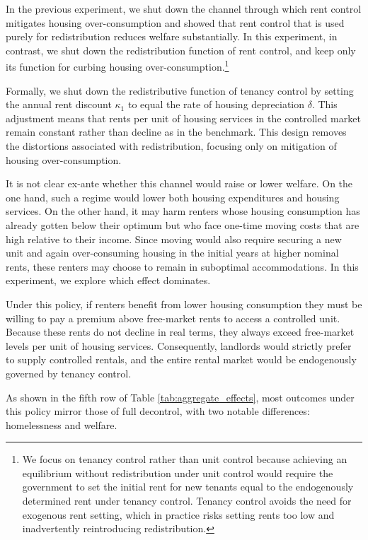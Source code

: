 \documentclass[parskip=full]{article}
\begin{document}
In the previous experiment, we shut down the channel through which rent control mitigates housing over-consumption and showed that rent control that is used purely for redistribution reduces welfare substantially. In this experiment, in contrast, we shut down the redistribution function of rent control, and keep only its function for curbing housing over-consumption.\footnote{We focus on tenancy control rather than unit control because achieving an equilibrium without redistribution under unit control would require the government to set the initial rent for new tenants equal to the endogenously determined rent under tenancy control. Tenancy control avoids the need for exogenous rent setting, which in practice risks setting rents too low and inadvertently reintroducing redistribution.}

Formally, we shut down the redistributive function of tenancy control by setting the annual rent discount $\kappa_1$ to equal the rate of housing depreciation $\delta$. This adjustment means that rents per unit of housing services in the controlled market remain constant rather than decline as in the benchmark. This design removes the distortions associated with redistribution, focusing only on mitigation of housing over-consumption. 

It is not clear ex-ante whether this channel would raise or lower welfare. On the one hand, such a regime would lower both housing expenditures and housing services. On the other hand, it may harm renters whose housing consumption has already gotten below their optimum but who face one-time moving costs that are high relative to their income. Since moving would also require securing a new unit and again over-consuming housing in the initial years at higher nominal rents,
these renters may choose to remain in suboptimal accommodations. In this experiment, we explore which effect dominates.

Under this policy, if renters benefit from lower housing consumption they must be willing to pay a premium above free-market rents to access a controlled unit. Because these rents do not decline in real terms, they always exceed free-market levels per unit of housing services. Consequently, landlords would strictly prefer to supply controlled rentals, and the entire rental market would be endogenously governed by tenancy control.

As shown in the fifth row of Table \ref{tab:aggregate_effects}, most outcomes under this policy mirror those of full decontrol, with two notable differences: homelessness and welfare. 
\end{document}
